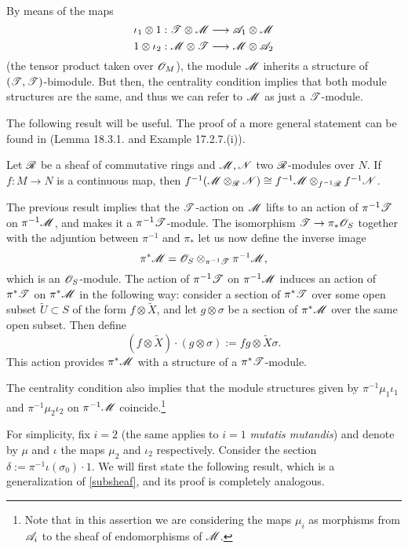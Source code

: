 By means of the maps
$$\iota_1\otimes 1:\mathscr{T}\otimes \mathscr{M}\longrightarrow \mathscr{A}_1\otimes \mathscr{M}$$
$$1\otimes \iota_2:\mathscr{M}\otimes \mathscr{T}\longrightarrow \mathscr{M}\otimes \mathscr{A}_2$$
(the tensor product taken over $\mathscr{O}_M$), the module $\mathscr{M}$ inherits a structure of $(\mathscr{T},\mathscr{T})$-bimodule. But then, the centrality condition implies that both module structures are the same, and thus we can refer to $\mathscr{M}$ as just a $\mathscr{T}$-module.

The following result will be useful. The proof of a more general statement can be found in \cite{kn:kscha} (Lemma 18.3.1. and Example 17.2.7.(i)).

\begin{lemma}
Let $\mathscr{R}$ be a sheaf of commutative rings and $\mathscr{M},\mathscr{N}$ two $\mathscr{R}$-modules over $N$. If $f :M\to N$ is a continuous map, then $f^{-1}(\mathscr{M}\otimes_{\mathscr{R}}\mathscr{N})\cong f^{-1}\mathscr{M}\otimes_{f^{-1}\mathscr{R}}f^{-1}\mathscr{N}$.
\end{lemma}

The previous result implies that the $\mathscr{T}$-action on $\mathscr{M}$ lifts to an action of $\pi^{-1}\mathscr{T}$ on $\pi^{-1}\mathscr{M}$, and makes it a $\pi^{-1}\mathscr{T}$-module. The isomorphism $\mathscr{T}\to \pi_*\mathscr{O}_S$ together with the adjuntion between $\pi^{-1}$ and $\pi_*$ let us now define the inverse image
$$\pi^*\mathscr{M}=\mathscr{O}_S\otimes_{\pi^{-1}\mathscr{T}}\pi^{-1}\mathscr{M},$$
which is an $\mathscr{O}_S$-module. The action of $\pi^{-1}\mathscr{T}$ on $\pi^{-1}\mathscr{M}$ induces an action of $\pi^*\mathscr{T}$ on $\pi^*\mathscr{M}$ in the following way: consider a section of $\pi^*\mathscr{T}$ over some open subset $\widetilde{U}\subset S$ of the form $f\otimes \widetilde{X}$, and let $g\otimes \sigma$ be a section of $\pi^*\mathscr{M}$ over the same open subset. Then define
$$(f\otimes \widetilde{X})\cdot (g\otimes \sigma):=fg\otimes \widetilde{X}\sigma .$$
This action provides $\pi^*\mathscr{M}$ with a structure of a $\pi^*\mathscr{T}$-module.

\begin{obs}
The centrality condition also implies that the module structures given by $\pi^{-1}\mu_1\iota_1$ and $\pi^{-1}\mu_2\iota_2$ on $\pi^{-1}\mathscr{M}$ coincide.\footnote{Note that in this assertion we are considering the maps $\mu_i$ as morphisms from $\mathscr{A}_i$ to the sheaf of endomorphisms of $\mathscr{M}$.}
\end{obs}

For simplicity, fix $i=2$ (the same applies to $i=1$ \emph{mutatis mutandis}) and denote by $\mu$ and $\iota$ the maps $\mu_2$ and $\iota_2$ respectively. Consider the section $\delta :=\pi^{-1}\iota (\sigma_0)\cdot 1$. We will first state the following result, which is a generalization of \ref{subsheaf}, and its proof is completely analogous.

